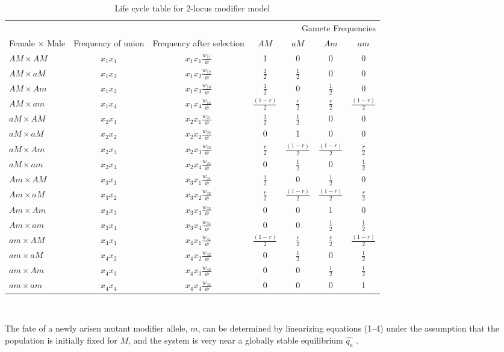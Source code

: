 \documentclass[11pt]{article}
\begin{document}
\renewcommand{\arraystretch}{1.5}
\begin{table}[h]
\caption{Life cycle table for 2-locus modifier model}
\label{Table:Life Cycle}
\centering
\begin{tabular}{l c c c c c c} 
\hline
\multicolumn{7}{r}{Gamete Frequencies} \\
\cline{4-7}
Female $\times$ Male & Frequency of union & Frequency after selection & $A M$ & $a M$ & $A m$ & $a m$\\
\hline
$A M \times A M$ & $x_1 x_1$ & $x_1 x_1 \frac{w_{11}}{\bar{w}}$ & 1  & 0  & 0  & 0 \\
$A M \times a M$ & $x_1 x_2$ &  $x_1 x_2 \frac{w_{12}}{\bar{w}}$ & $\frac{1}{2}$ & $\frac{1}{2}$ & 0 & 0 \\
$A M \times A m$ & $x_1 x_3$  & $x_1 x_3 \frac{w_{13}}{\bar{w}}$ & $\frac{1}{2}$ & 0 & $\frac{1}{2}$ & 0 \\
$A M \times a m$ & $x_1 x_4$  & $x_1 x_4 \frac{w_{14}}{\bar{w}}$ & $\frac{(1-r)}{2}$ & $\frac{r}{2}$ & $\frac{r}{2}$ & $\frac{(1-r)}{2}$ \\
$a M \times A M$ & $x_2 x_1$  & $x_2 x_1 \frac{w_{21}}{\bar{w}}$ & $\frac{1}{2}$ & $\frac{1}{2}$ & 0 & 0 \\
$a M \times a M$ & $x_2 x_2$  & $x_2 x_2 \frac{w_{22}}{\bar{w}}$ & 0 & 1 & 0 & 0 \\
$a M \times A m$ & $x_2 x_3$  & $x_2 x_3 \frac{w_{23}}{\bar{w}}$ & $\frac{r}{2}$ & $\frac{(1-r)}{2}$ & $\frac{(1-r)}{2}$ & $\frac{r}{2}$ \\
$a M \times a m$ & $x_2 x_4$  & $x_2 x_4 \frac{w_{24}}{\bar{w}}$ & 0 & $\frac{1}{2}$ & 0 & $\frac{1}{2}$ \\
$A m \times A M$ & $x_3 x_1$  & $x_3 x_1 \frac{w_{31}}{\bar{w}}$ & $\frac{1}{2}$ & 0 & $\frac{1}{2}$ & 0 \\
$A m \times a M$ & $x_3 x_2$  & $x_3 x_2 \frac{w_{32}}{\bar{w}}$ & $\frac{r}{2}$ & $\frac{(1-r)}{2}$ & $\frac{(1-r)}{2}$ & $\frac{r}{2}$\\
$A m \times A m$ & $x_3 x_3$  & $x_3 x_3 \frac{w_{33}}{\bar{w}}$ & 0 & 0 & 1 & 0 \\
$A m \times a m$ & $x_3 x_4$  & $x_3 x_4 \frac{w_{34}}{\bar{w}}$ & 0 & 0 & $\frac{1}{2}$ & $\frac{1}{2}$ \\
$a m \times A M$ & $x_4 x_1$  & $x_4 x_1 \frac{w_{41}}{\bar{w}}$ & $\frac{(1-r)}{2}$ & $\frac{r}{2}$ & $\frac{r}{2}$ & $\frac{(1-r)}{2}$ \\
$a m \times a M$ & $x_4 x_2$  & $x_4 x_2 \frac{w_{42}}{\bar{w}}$ & 0 & $\frac{1}{2}$ & 0 & $\frac{1}{2}$ \\
$a m \times A m$ & $x_4 x_3$  & $x_4 x_3 \frac{w_{43}}{\bar{w}}$ & 0 & 0 & $\frac{1}{2}$ & $\frac{1}{2}$ \\
$a m \times a m$ & $x_4 x_4$  & $x_4 x_4 \frac{w_{44}}{\bar{w}}$ & 0 & 0 & 0 & 1 \\
\hline
\end{tabular}
\bigskip{}
\\
\end{table}

\newpage{}

The fate of a newly arisen mutant modifier allele, $m$, can be determined by linearizing equations (1--4) under the assumption that the population is initially fixed for $M$, and the system is very near a globally stable equilibrium $\hat{q_a}$ .
\end{document}
